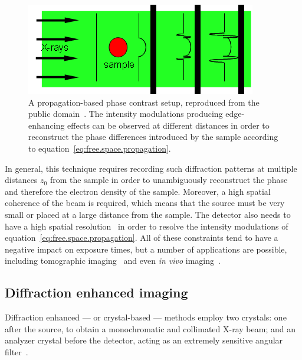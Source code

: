 \begin{figure}[htb]
    \centering
    \includegraphics[width=.7\textwidth]{gfx/propagation-based_imaging.png}
    \caption[Propagation-based setup.]{A propagation-based phase contrast
        setup, reproduced from the public domain~\parencite{propagation-based-picture}. The intensity modulations producing edge-enhancing effects can
be observed at different distances in order to reconstruct the phase
differences introduced by the sample according to
equation~\eqref{eq:free.space.propagation}.}
    \label{fig:propagation.based}
\end{figure}

In general, this technique requires recording such diffraction patterns at
multiple distances $z_0$ from the sample in order to unambiguously
reconstruct the phase and therefore the electron density of the sample.
Moreover, a high spatial coherence of the beam is required, which means
that the source must be very small or placed at a large distance from
the sample. The detector also needs to have a high spatial
resolution~\parencite{Pogany1997,2005RScI...76i3706N,2008OExpr..16.3223G} in
order to resolve the intensity modulations of
equation~\eqref{eq:free.space.propagation}. All of these constraints tend to
have a negative impact on exposure times, but a number of applications are
possible, including tomographic
imaging~\parencite{1997JAP....81.5878C,2009RScI...80e6101B,2012PLoSO...735691L}
and even \emph{in vivo} imaging~\parencite{2007NIMPA.572..237C}.

\subsection{Diffraction enhanced imaging}
Diffraction enhanced --- or crystal-based --- methods employ two crystals:
one after the source, to obtain a monochromatic and collimated X-ray beam;
and an analyzer crystal before the detector, acting as an extremely
sensitive angular filter~\parencite{pmid10751500}.

